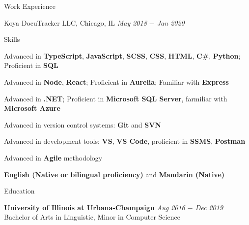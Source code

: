 \documentclass{resume}
\begin{document}
\begin{rSection}{Work Experience}
\begin{rSubsection}{Koya DocuTracker LLC, Chicago, IL} {\textit{May 2018 $-$ Jan 2020}}
\end{rSubsection}

\end{rSection}

\begin{rSection}{Skills}

\begin{rSubsection}{}{}
{} %

    \item Advanced in \textbf{TypeScript}, \textbf{JavaScript}, \textbf{SCSS}, \textbf{CSS}, \textbf{HTML}, \textbf{C\#}, \textbf{Python}; Proficient in \textbf{SQL}
    \item Advanced in \textbf{Node}, \textbf{React}; Proficient in \textbf{Aurelia}; Familiar with \textbf{Express}
    \item Advanced in \textbf{.NET}; Proficient in \textbf{Microsoft SQL Server}, farmiliar with \textbf{Microsoft Azure}
    \item Advanced in version control systems: \textbf{Git} and \textbf{SVN}
    \item Advanced in development tools: \textbf{VS}, \textbf{VS Code}, proficient in \textbf{SSMS}, \textbf{Postman}
    \item Advanced in \textbf{Agile} methodology
    \item \textbf{English (Native or bilingual proficiency)} and \textbf{Mandarin (Native)}


\end{rSubsection}

\end{rSection}

\begin{rSection}{Education}

    \item {\bf University of Illinois at Urbana-Champaign} \hfill {\em Aug 2016 $-$ Dec 2019}
    \\ Bachelor of Arts in Linguistic, Minor in Computer Science

\end{rSection}
\end{document}
